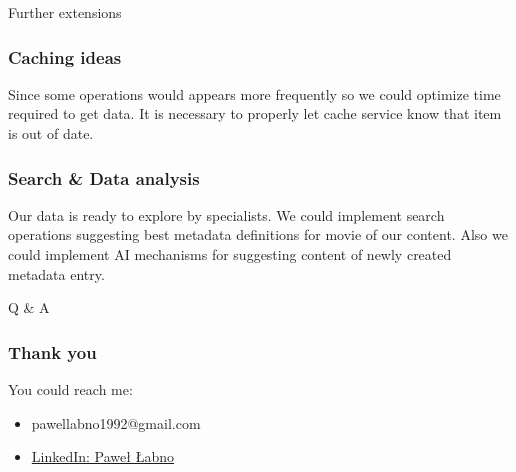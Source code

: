 \documentclass{beamer}
\begin{document}
\begin{section}{Further extensions}

\begin{frame}
\frametitle{Caching ideas}
Since some operations would appears more frequently so we could optimize time required to get data. It is necessary to properly let cache service know that item is out of date.
\end{frame}

\begin{frame}
\frametitle{Search \& Data analysis}
Our data is ready to explore by specialists. We could implement search operations suggesting best metadata definitions for movie of our content. Also we could implement AI mechanisms for suggesting content of newly created metadata entry.
\end{frame}

\end{section}



\begin{section}{Q \& A}

\begin{frame}
\frametitle{Thank you}
You could reach me: \\

 \begin{itemize}
	  \item pawellabno1992@gmail.com
	  \item \href{https://www.linkedin.com/in/paweł-łabno-72160b68}{LinkedIn: Paweł Łabno}
\end{itemize}

\end{frame}


\end{section}
\end{document}
